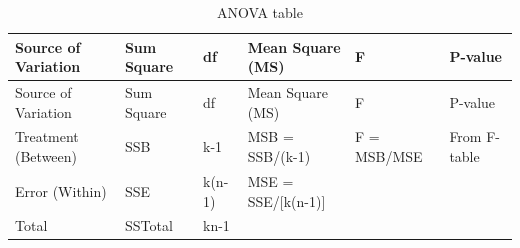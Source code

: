 \documentclass[
]{book}
\begin{document}
\begin{longtable}[]{@{}
  >{\raggedright\arraybackslash}p{}
  >{\raggedright\arraybackslash}p{}
  >{\raggedright\arraybackslash}p{}
  >{\raggedright\arraybackslash}p{}
  >{\raggedright\arraybackslash}p{}
  >{\raggedright\arraybackslash}p{}@{}}
\caption{\label{tab:anova-tab-temp} ANOVA table}\tabularnewline
\toprule\noalign{}
\begin{minipage}[b]{\linewidth}\raggedright
Source of Variation
\end{minipage} & \begin{minipage}[b]{\linewidth}\raggedright
Sum Square
\end{minipage} & \begin{minipage}[b]{\linewidth}\raggedright
df
\end{minipage} & \begin{minipage}[b]{\linewidth}\raggedright
Mean Square (MS)
\end{minipage} & \begin{minipage}[b]{\linewidth}\raggedright
F
\end{minipage} & \begin{minipage}[b]{\linewidth}\raggedright
P-value
\end{minipage} \\
\midrule\noalign{}
\endfirsthead
\toprule\noalign{}
\begin{minipage}[b]{\linewidth}\raggedright
Source of Variation
\end{minipage} & \begin{minipage}[b]{\linewidth}\raggedright
Sum Square
\end{minipage} & \begin{minipage}[b]{\linewidth}\raggedright
df
\end{minipage} & \begin{minipage}[b]{\linewidth}\raggedright
Mean Square (MS)
\end{minipage} & \begin{minipage}[b]{\linewidth}\raggedright
F
\end{minipage} & \begin{minipage}[b]{\linewidth}\raggedright
P-value
\end{minipage} \\
\midrule\noalign{}
\endhead
\bottomrule\noalign{}
\endlastfoot
Treatment (Between) & SSB & k-1 & MSB = SSB/(k-1) & F = MSB/MSE & From F-table \\
Error (Within) & SSE & k(n-1) & MSE = SSE/{[}k(n-1){]} & & \\
Total & SSTotal & kn-1 & & & \\
\end{longtable}
\end{document}
